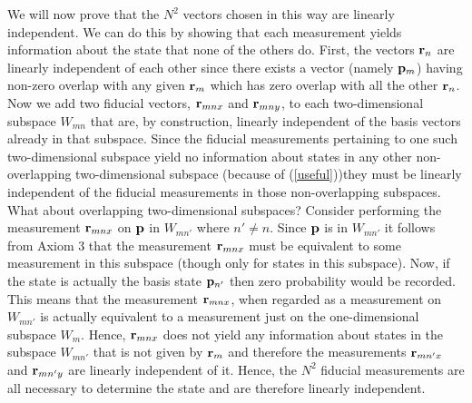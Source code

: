 \documentclass[10pt,twocolumn]{article}
\begin{document}
We will now prove that the $N^2$ vectors chosen in this way are linearly
independent. We can do this by showing that each
measurement yields information about the state that none of the others do.
First, the vectors ${\bf r}_n$ are linearly independent of
each other since there exists a vector (namely ${\bf p}_m$) having
non-zero overlap with any given ${\bf r}_m$ which has zero overlap with all the
other ${\bf r}_n$. Now we add two fiducial vectors, ${\bf r}_{mnx}$ and
${\bf r}_{mny}$, to each two-dimensional
subspace $W_{mn}$ that are, by construction, linearly independent of the
basis vectors already in that subspace.  Since the fiducial measurements
pertaining to one
such two-dimensional subspace yield no information about states in any
other non-overlapping two-dimensional subspace (because of
(\ref{useful}))they must be linearly independent of the fiducial
measurements in those
non-overlapping subspaces.  What about overlapping two-dimensional
subspaces? Consider performing the measurement
${\bf r}_{mnx}$ on ${\bf p}$ in $W_{mn'}$ where $n'\not=n$.  Since
${\bf p}$ is in $W_{mn'}$ it follows from Axiom 3 that the measurement
${\bf r}_{mnx}$ must be equivalent to some measurement in this subspace
(though only for states in this subspace).  Now, if the state is
actually the basis state ${\bf p}_{n'}$ then zero probability would be
recorded.  This means that the measurement ${\bf r}_{mnx}$, when
regarded as a measurement on $W_{mn'}$ is actually equivalent to a
measurement just on the one-dimensional subspace $W_m$.
Hence, ${\bf r}_{mnx}$ does not yield any information about states in the
subspace $W_{mn'}$ that is not given by ${\bf r}_m$ and therefore the
measurements ${\bf r}_{mn'x}$ and ${\bf r}_{mn'y}$ are linearly
independent of it.  Hence, the $N^2$ fiducial measurements are all
necessary to determine the state and are therefore linearly independent.

\vspace{4mm}


\vspace{4mm}
\end{document}
